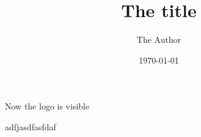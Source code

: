 \documentclass{beamer}
\title{The title}
\author[The author]{The Author}
\institute[Inst.]{The Institute}
\date{\today}
\begin{document}
\begin{frame}
\maketitle
\end{frame}


\begin{frame}
Now the logo is visible
\end{frame}

\begin{frame}
    adfjasdfasfdaf
\end{frame}
\end{document}
